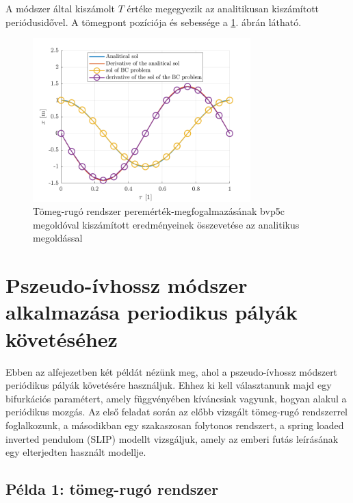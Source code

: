 A módszer által kiszámolt $T$ értéke megegyezik az analitikusan kiszámított periódusidővel.
A tömegpont pozíciója és sebessége a \ref{fig:bvp_tomeg_rugo_traj_vel}. ábrán látható.

\begin{figure}[ht]
	\centering
	\includegraphics[width=0.75\textwidth]{graphics/BVP_tomeg_rugo}
	\caption{Tömeg-rugó rendszer peremérték-megfogalmazásának bvp5c megoldóval kiszámított eredményeinek összevetése az analitikus megoldással}\label{fig:bvp_tomeg_rugo_traj_vel}
\end{figure}

\section{Pszeudo-ívhossz módszer alkalmazása periodikus pályák kö\-ve\-té\-sé\-hez}

Ebben az alfejezetben két példát nézünk meg, ahol a pszeudo-ívhossz mód\-szert periódikus pályák követésére használjuk.
Ehhez ki kell választanunk majd egy bifurkációs paramétert, amely függvényében kíváncsiak vagyunk, hogyan alakul a periódikus mozgás.
Az első feladat során az előbb vizsgált tömeg-rugó rendszerrel foglalkozunk, a másodikban egy szakaszosan folytonos rendszert, a spring loaded inverted pendulom (SLIP) modellt vizsgáljuk, amely az emberi futás leírásának egy elterjedten használt modellje.

\subsection{Példa 1: tömeg-rugó rendszer}


